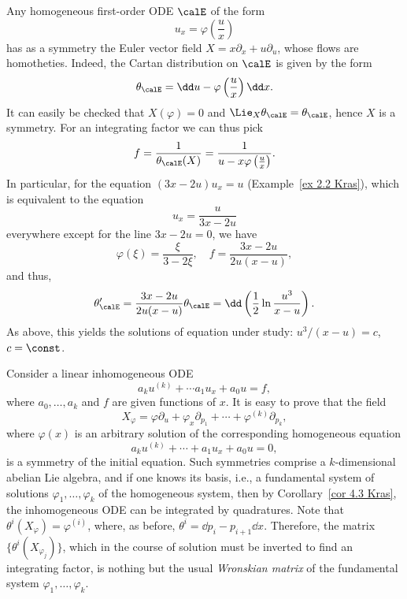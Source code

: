 \begin{example}
    Any homogeneous first-order ODE $\calE$ of the form
    \[u_x=\varphi\left(\frac{u}{x}\right)\]
    has as a symmetry the Euler vector field $X=x\partial_x+u\partial_u$, whose flows are homotheties. Indeed, the Cartan distribution on $\calE$ is given by the form 
    \[\theta_\calE=\dd u-\varphi\left(\frac{u}{x}\right)\dd x.\]
    It can easily be checked that $X(\varphi)=0$ and $\Lie_X\theta_\calE=\theta_\calE$, hence $X$ is a symmetry. For an integrating factor we can thus pick 
    \[f=\frac{1}{\theta_\calE(X)}=\frac{1}{u-x\varphi\left(\frac{u}{x}\right)}.\]
    In particular, for the equation $(3x-2u)u_x=u$ (Example~\ref{ex 2.2 Kras}), which is equivalent to the equation 
    \[u_x=\frac{u}{3x-2u}\]
    everywhere except for the line $3x-2u=0$, we have 
    \[\varphi(\xi)=\frac{\xi}{3-2\xi},\quad f=\frac{3x-2u}{2u(x-u)},\]
    and thus,
    \[\theta_\calE'=\frac{3x-2u}{2u(x-u)}\theta_\calE=\dd\left(\frac12\ln\frac{u^3}{x-u}\right).\]
    As above, this yields the solutions of equation under study: $u^3/(x-u)=c$, $c=\const$.
\end{example}


\begin{example}
    Consider a linear inhomogeneous ODE 
    \[a_ku^{(k)}+\cdots a_1u_x+a_0u=f,\]
    where $a_0,\ldots,a_k$ and $f$ are given functions of $x$. It is easy to prove that the field 
    \[X_\varphi=\varphi\partial_u+\varphi_x\partial_{p_1}+\cdots+\varphi^{(k)}\partial_{p_k},\]
    where $\varphi(x)$ is an arbitrary solution of the corresponding homogeneous equation 
    \[a_ku^{(k)}+\cdots+a_1u_x+a_0u=0,\]
    is a symmetry of the initial equation. Such symmetries comprise a $k$-dimensional abelian Lie algebra, and if one knows its basis, i.e., a fundamental system of solutions $\varphi_1,\ldots,\varphi_k$ of the homogeneous system, then by Corollary~\ref{cor 4.3 Kras}, the inhomogeneous ODE can be integrated by quadratures. Note that $\theta^i(X_\varphi)=\varphi^{(i)}$, where, as before, $\theta^i=\dd p_i-p_{i+1}\dd x$. Therefore, the matrix $\{\theta^i(X_{\varphi_j})\}$, which in the course of solution must be inverted to find an integrating factor, is nothing but the usual \emph{Wronskian matrix} of the fundamental system $\varphi_1,\ldots,\varphi_k$.
\end{example}

